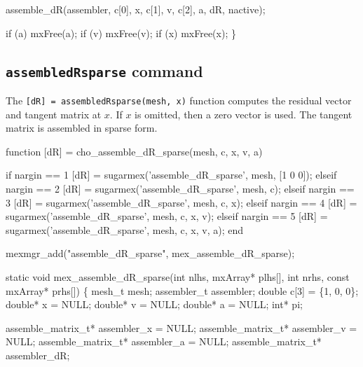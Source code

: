     assemble_dR(assembler, c[0], x, c[1], v, c[2], a, dR, nactive);

    if (a) mxFree(a);
    if (v) mxFree(v);
    if (x) mxFree(x);
\}

\nwendcode{}\nwdocspar


\subsection{{\tt{}assemble{}dR{}sparse} command}

The {\tt{}[dR]\ =\ assemble{}dR{}sparse(mesh,\ x)} function computes the
residual vector and tangent matrix at $x$.  If $x$ is omitted,
then a zero vector is used.  The tangent matrix is assembled 
in sparse form.

\nwenddocs{}\endmoddef
function [dR] = cho_assemble_dR_sparse(mesh, c, x, v, a)

if nargin == 1
    [dR] = sugarmex('assemble_dR_sparse', mesh, [1 0 0]);
elseif nargin == 2
    [dR] = sugarmex('assemble_dR_sparse', mesh, c);
elseif nargin == 3
    [dR] = sugarmex('assemble_dR_sparse', mesh, c, x);
elseif nargin == 4
    [dR] = sugarmex('assemble_dR_sparse', mesh, c, x, v);
elseif nargin == 5
    [dR] = sugarmex('assemble_dR_sparse', mesh, c, x, v, a);
end
\nwendcode{}\nwdocspar

\nwenddocs{}\plusendmoddef
mexmgr_add("assemble_dR_sparse", mex_assemble_dR_sparse);
\nwendcode{}\nwdocspar

\nwenddocs{}\plusendmoddef
static void mex_assemble_dR_sparse(int nlhs, mxArray* plhs[],
                                   int nrhs, const mxArray* prhs[])
\{
    mesh_t      mesh;
    assembler_t assembler;
    double      c[3] = \{1, 0, 0\};
    double*     x = NULL;
    double*     v = NULL;
    double*     a = NULL;
    int*        pi;

    assemble_matrix_t* assembler_x = NULL;
    assemble_matrix_t* assembler_v = NULL;
    assemble_matrix_t* assembler_a = NULL;
    assemble_matrix_t* assembler_dR;

